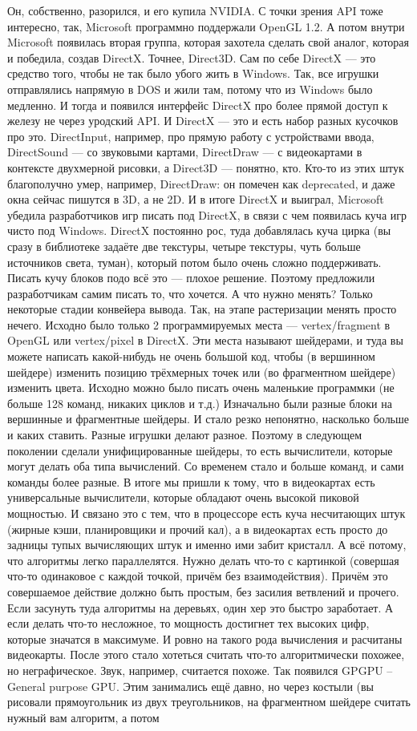 \documentclass{article}
\begin{document}
Он, собственно, разорился, и его купила NVIDIA. С точки зрения API тоже интересно, так, Microsoft программно поддержали OpenGL 1.2. А потом внутри Microsoft появилась вторая группа, которая захотела сделать свой аналог, которая и победила, создав DirectX. Точнее, Direct3D. Сам по себе DirectX --- это средство того, чтобы не так было убого жить в Windows. Так, все игрушки отправлялись напрямую в DOS и жили там, потому что из Windows было медленно. И тогда и появился интерфейс DirectX про более прямой доступ к железу не через уродский API. И DirectX --- это и есть набор разных кусочков про это. DirectInput, например, про прямую работу с устройствами ввода, DirectSound --- со звуковыми картами, DirectDraw --- с видеокартами в контексте двухмерной рисовки, а Direct3D --- понятно, кто. Кто-то из этих штук благополучно умер, например, DirectDraw: он помечен как deprecated, и даже окна сейчас пишутся в 3D, а не 2D. И в итоге DirectX и выиграл, Microsoft убедила разработчиков игр писать под DirectX, в связи с чем появилась куча игр чисто под Windows. DirectX постоянно рос, туда добавлялась куча цирка (вы сразу в библиотеке задаёте две текстуры, четыре текстуры, чуть больше источников света, туман), который потом было очень сложно поддерживать. Писать кучу блоков подо всё это --- плохое решение. Поэтому предложили разработчикам самим писать то, что хочется. А что нужно менять? Только некоторые стадии конвейера вывода. Так, на этапе растеризации менять просто нечего. Исходно было только 2 программируемых места --- vertex/fragment в OpenGL или vertex/pixel в DirectX. Эти места называют шейдерами, и туда вы можете написать какой-нибудь не очень большой код, чтобы (в вершинном шейдере) изменить позицию трёхмерных точек или (во фрагментном шейдере) изменить цвета. Исходно можно было писать очень маленькие программки (не больше 128 команд, никаких циклов и т.д.) Изначально были разные блоки на вершинные и фрагментные шейдеры. И стало резко непонятно, насколько больше и каких ставить. Разные игрушки делают разное. Поэтому в следующем поколении сделали унифицированные шейдеры, то есть вычислители, которые могут делать оба типа вычислений. Со временем стало и больше команд, и сами команды более разные. В итоге мы пришли к тому, что в видеокартах есть универсальные вычислители, которые обладают очень высокой пиковой мощностью. И связано это с тем, что в процессоре есть куча несчитающих штук (жирные кэши, планировщики и прочий кал), а в видеокартах есть просто до задницы тупых вычисляющих штук и именно ими забит кристалл. А всё потому, что алгоритмы легко параллелятся. Нужно делать что-то с картинкой (совершая что-то одинаковое с каждой точкой, причём без взаимодействия). Причём это совершаемое действие должно быть простым, без засилия ветвлений и прочего. Если засунуть туда алгоритмы на деревьях, один хер это быстро заработает. А если делать что-то несложное, то мощность достигнет тех высоких цифр, которые значатся в максимуме. И ровно на такого рода вычисления и расчитаны видеокарты. После этого стало хотеться считать что-то алгоритмически похожее, но неграфическое. Звук, например, считается похоже. Так появился GPGPU -- General purpose GPU. Этим занимались ещё давно, но через костыли (вы рисовали прямоугольник из двух треугольников, на фрагментном шейдере считать нужный вам алгоритм, а потом 
\end{document}
